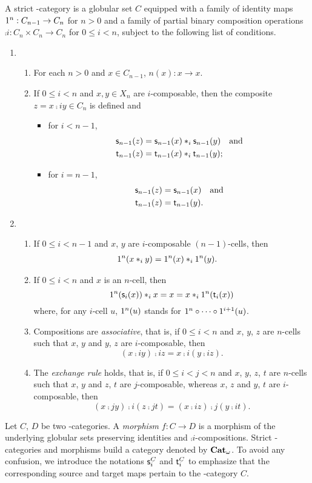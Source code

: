 A strict \oo-category  is a globular set $C$ equipped with a family of identity maps
$1^{n}:C_{n-1}\to C_n$ for $n>0$ and a family of partial binary composition operations  $\comp i:C_n\times C_n\to C_n$ for $0\leq i< n$, subject to the following list of conditions. 
\begin{enumerate}
\item
  \begin{enumerate}
  \item For each $n>0$ and $x\in C_{n-1}$, $\unit{n}(x): x\to x$.
  \item If $0\leq i<n$ and $x,y\in X_n$ are $i$-composable, then the composite $z=x\comp i y\in C_n$ is defined and
    \begin{itemize}
    \item for $i<n-1$,
      \begin{align*}
        \mathsf{s}_{n-1}(z) & =\mathsf{s}_{n-1}(x)\ast_{i}\mathsf{s}_{n-1}(y)\quad \hbox{and}\\
        \mathsf{t}_{n-1}(z) & =\mathsf{t}_{n-1}(x)\ast_{i}\mathsf{t}_{n-1}(y) ;
      \end{align*}
    \item  for $i=n-1$,
      \begin{align*}
        \mathsf{s}_{n-1}(z) & =\mathsf{s}_{n-1}(x) \quad \hbox{and}\\
         \mathsf{t}_{n-1}(z) & =\mathsf{t}_{n-1}(y).
      \end{align*}
    \end{itemize}
    \end{enumerate}
\item
  \begin{enumerate}
  \item If $0\leq i <n-1$ and $x$, $y$ are $i$-composable $(n{-}1)$-cells, then
    \begin{align*}
      1^{n}(x\ast_{i} y) & =1^{n}(x)\ast_{i} 1^{n}(y).
    \end{align*}
  \item If $0\leq i<n$ and $x$ is an $n$-cell, then
    \[1^{n}(\mathsf{s}_{i}(x))\ast_{i} x=x=x\ast_{i}1^{n}(\mathsf{t}_{i}(x))\]
    where, for any $i$-cell $u$, $1^{n}(u)$ stands for $1^{n}\circ\cdots\circ1^{i+1}(u)$.
  \item Compositions are {\em associative}, that is, if $0\leq i<n$ and $x$, $y$, $z$ are $n$-cells such that $x$, $y$ and $y$, $z$ are $i$-composable, then
    \[(x\comp i y)\comp i z=x\comp i (y\comp i z).\]
  \item The {\em exchange rule} holds, that is, if $0\leq i<j<n$ and $x$, $y$, $z$, $t$ are $n$-cells such that $x$, $y$ and $z$, $t$ are $j$-composable, whereas $x$, $z$ and $y$, $t$ are $i$-composable, then
    \[(x\comp j y)\comp i (z\comp j t)= (x\comp i z)\comp j (y\comp i t).\]
  \end{enumerate}
\end{enumerate}
Let $C$, $D$ be two \oo-categories. A {\em morphism} $f:C\to D$ is a
morphism of the underlying globular sets preserving identities and
$\comp i$-compositions. Strict \oo-categories and morphisms build a
category denoted by $\mathbf{Cat}_{\omega}$. To avoid any confusion, we introduce the notations $\mathsf{s}_{i}^C$ and
$\mathsf{t}_{i}^C$ to
emphasize that the corresponding source and target maps pertain to the
\oo-category $C$. 


